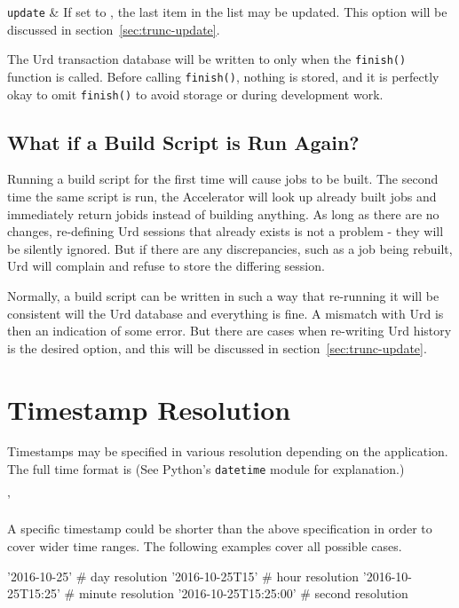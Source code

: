 \RPtwo \texttt{update} &  If set to \pyTrue, the last item in the list may be updated.
  This option will be discussed in section~\ref{sec:trunc-update}.\\[2ex]
\stoptabletwo

The Urd transaction database will be written to only when
the \texttt{finish()} function is called.  Before
calling \texttt{finish()}, nothing is stored, and it is perfectly okay
to omit \texttt{finish()} to avoid storage or during development work.




\subsection{What if a Build Script is Run Again?}
Running a build script for the first time will cause jobs to be built.
The second time the same script is run, the Accelerator will look up
already built jobs and immediately return jobids instead of building
anything.  As long as there are no changes, re-defining Urd sessions
that already exists is not a problem - they will be silently ignored.
But if there are any discrepancies, such as a job being rebuilt, Urd
will complain and refuse to store the differing session.

Normally, a build script can be written in such a way that re-running
it will be consistent will the Urd database and everything is fine.  A
mismatch with Urd is then an indication of some error.  But there are
cases when re-writing Urd history is the desired option, and this will
be discussed in section~\ref{sec:trunc-update}.







\section{Timestamp Resolution}

Timestamps may be specified in various resolution depending on the
application.  The full time format is (See Python's \texttt{datetime}
module for explanation.)
\begin{shell}
'%
\end{shell}
A specific timestamp could be shorter than the above specification in
order to cover wider time ranges.  The following examples cover all
possible cases.
\begin{python}
'2016-10-25'               # day resolution
'2016-10-25T15'            # hour resolution
'2016-10-25T15:25'         # minute resolution
'2016-10-25T15:25:00'      # second resolution
\end{python}



